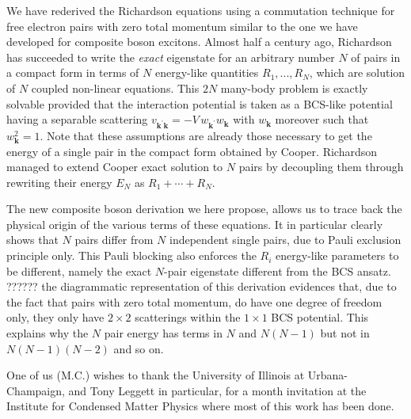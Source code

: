 \documentclass[aps,prb,superscriptaddress,twocolumn]{revtex4}
\newcommand{\vk}{\ensuremath{\mathbf{k}}}
\begin{document}
We have rederived the Richardson equations using a commutation technique for
free electron pairs with zero total momentum similar to the one we have
developed for composite boson excitons. Almost half a century ago,
Richardson has succeeded to write the \emph{exact} eigenstate for an
arbitrary number $N$ of pairs in a compact form in terms of $N$ energy-like
quantities $R_1,..., R_N$, which are solution of $N$ coupled non-linear
equations. This $2N$ many-body problem is exactly solvable provided that the
interaction potential is taken as a BCS-like potential having a separable
scattering $v_{\mathbf{k} ^{\prime}\mathbf{k} }=-V\,w_{\mathbf{k}
^{\prime}}w_{\mathbf{k} }$ with $w_{\mathbf{k} }$ moreover such that $%
w_\vk^2=1$. Note that these assumptions are already those necessary to get
the energy of a single pair in the compact form obtained by Cooper.
Richardson managed to extend Cooper exact solution to $N$ pairs by
decoupling them through rewriting their energy $E_N$ as $R_1+\cdots+R_N$.

The new composite boson derivation we here propose, allows us to trace back
the physical origin of the various terms of these equations. It in
particular clearly shows that $N$ pairs differ from $N$ independent single
pairs, due to Pauli exclusion principle only. This Pauli blocking also
enforces the $R_i$ energy-like parameters to be different, namely the exact $%
N$-pair eigenstate different from the BCS ansatz. ?????? the diagrammatic
representation of this derivation evidences that, due to the fact that pairs
with zero total momentum, do have one degree of freedom only, they only have 
$2\times2$ scatterings within the $1\times1$ BCS potential. This explains
why the $N$ pair energy has terms in $N$ and $N(N-1)$ but not in $N(N-1)(N-2)
$ and so on.

One of us (M.C.) wishes to thank the University of Illinois at
Urbana-Champaign, and Tony Leggett in particular, for a month invitation at
the Institute for Condensed Matter Physics where most of this work has been
done.
\end{document}

